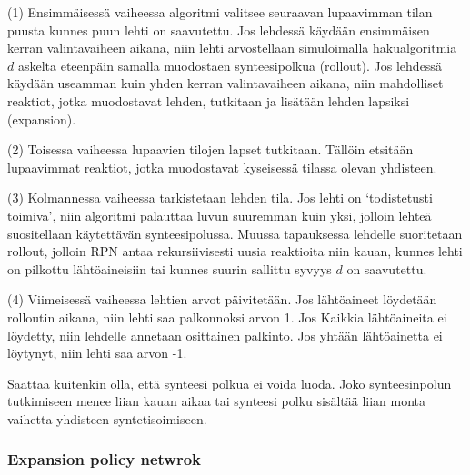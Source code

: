 \documentclass[finnish,twoside,censored,tkt,sw-line]{HYthesisML}
\begin{document}
(1) Ensimmäisessä vaiheessa algoritmi valitsee seuraavan lupaavimman tilan puusta kunnes puun lehti on saavutettu.
Jos lehdessä käydään ensimmäisen kerran valintavaiheen aikana, niin lehti arvostellaan simuloimalla hakualgoritmia \(d\) askelta eteenpäin samalla muodostaen synteesipolkua (rollout).
Jos lehdessä käydään useamman kuin yhden kerran valintavaiheen aikana, niin mahdolliset reaktiot, jotka muodostavat lehden, tutkitaan ja lisätään lehden lapsiksi (expansion).

(2) Toisessa vaiheessa lupaavien tilojen lapset tutkitaan.
Tällöin etsitään lupaavimmat reaktiot, jotka muodostavat kyseisessä tilassa olevan yhdisteen.

(3) Kolmannessa vaiheessa tarkistetaan lehden tila.
Jos lehti on `todistetusti toimiva', niin algoritmi palauttaa luvun suuremman kuin yksi, jolloin lehteä suositellaan käytettävän synteesipolussa.
Muussa tapauksessa lehdelle suoritetaan rollout, jolloin RPN antaa rekursiivisesti uusia reaktioita niin kauan, kunnes lehti on pilkottu lähtöaineisiin tai kunnes suurin sallittu syvyys \(d\) on saavutettu.

(4) Viimeisessä vaiheessa lehtien arvot päivitetään.
Jos lähtöaineet löydetään rolloutin aikana, niin lehti saa palkonnoksi arvon 1.
Jos Kaikkia lähtöaineita ei löydetty, niin lehdelle annetaan osittainen palkinto.
Jos yhtään lähtöainetta ei löytynyt, niin lehti saa arvon -1.

Saattaa kuitenkin olla, että synteesi polkua ei voida luoda.
Joko synteesinpolun tutkimiseen menee liian kauan aikaa tai synteesi polku sisältää liian monta vaihetta yhdisteen syntetisoimiseen.


\subsubsection{Expansion policy netwrok}
\end{document}
